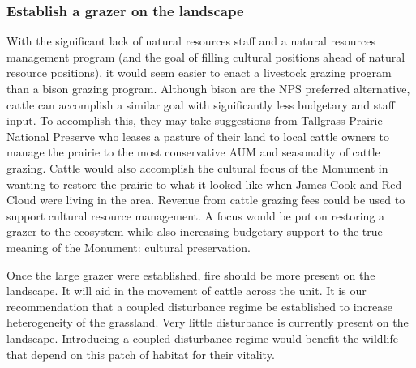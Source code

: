 \subsubsection{Establish a grazer on the landscape}

With the significant lack of natural resources staff and a natural resources management program (and the goal of filling cultural positions ahead of natural resource positions), it would seem easier to enact a livestock grazing program than a bison grazing program. 
Although bison are the NPS preferred alternative, cattle can accomplish a similar goal with significantly less budgetary and staff input. 
To accomplish this, they may take suggestions from Tallgrass Prairie National Preserve who leases a pasture of their land to local cattle owners to manage the prairie to the most conservative AUM and seasonality of cattle grazing.
Cattle would also accomplish the cultural focus of the Monument in wanting to restore the prairie to what it looked like when James Cook and Red Cloud were living in the area.
Revenue from cattle grazing fees could be used to support cultural resource management. 
A focus would be put on restoring a grazer to the ecosystem while also increasing budgetary support to the true meaning of the Monument: cultural preservation.

Once the large grazer were established, fire should be more present on the landscape. 
It will aid in the movement of cattle across the unit. 
It is our recommendation that a coupled disturbance regime be established to increase heterogeneity of the grassland. 
Very little disturbance is currently present on the landscape. 
Introducing a coupled disturbance regime would benefit the wildlife that depend on this patch of habitat for their vitality.
